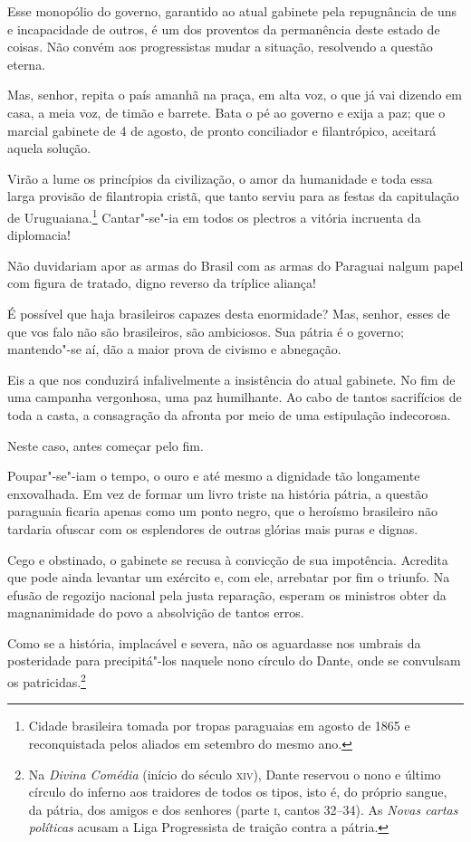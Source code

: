 \begin{linenumbers}
 Esse monopólio do governo, garantido ao atual gabinete pela repugnância
de uns e incapacidade de outros, é um dos proventos da permanência
deste estado de coisas. Não convém aos progressistas mudar a situação,
resolvendo a questão eterna. 

 Mas, senhor, repita o país amanhã na praça, em alta voz, o que já vai
dizendo em casa, a meia voz, de timão e barrete. Bata o pé ao governo e
exija a paz; que o marcial gabinete de 4 de agosto, de pronto
conciliador e filantrópico, aceitará aquela solução. 

 Virão a lume os princípios da civilização, o amor da humanidade e toda
essa larga provisão de filantropia cristã, que tanto serviu para as
festas da capitulação de
Uruguaiana.\footnote{ Cidade brasileira tomada por tropas paraguaias em agosto de 1865 e
reconquistada pelos aliados em setembro do mesmo ano.}
 Cantar"-se"-ia em todos os plectros a vitória incruenta da diplomacia!

 Não duvidariam apor as armas do Brasil com as armas do Paraguai nalgum
papel com figura de tratado, digno reverso da tríplice aliança!

É possível que haja brasileiros capazes desta enormidade? Mas, senhor,
esses de que vos falo não são brasileiros, são ambiciosos. Sua pátria é
o governo; mantendo"-se aí, dão a maior prova de civismo e abnegação. 

 Eis a que nos conduzirá infalivelmente a insistência do atual gabinete.
No fim de uma campanha vergonhosa, uma paz humilhante. Ao cabo de
tantos sacrifícios de toda a casta, a consagração da afronta por meio
de uma estipulação indecorosa. 

 Neste caso, antes começar pelo fim.

 Poupar"-se"-iam o tempo, o ouro e até mesmo a dignidade tão
longamente enxovalhada. Em vez de formar um livro triste na história
pátria, a questão paraguaia ficaria apenas como um ponto negro, que o
heroísmo brasileiro não tardaria ofuscar com os esplendores de outras
glórias mais puras e dignas.

 Cego e obstinado, o gabinete se recusa à convicção de sua impotência.
Acredita que pode ainda levantar um exército e, com ele, arrebatar por
fim o triunfo. Na efusão de regozijo nacional pela justa reparação,
esperam os ministros obter da magnanimidade do povo a absolvição de
tantos erros.

 Como se a história, implacável e severa, não os aguardasse nos umbrais
da posteridade para precipitá"-los naquele nono círculo do Dante, onde
se convulsam os
patricidas.\footnote{ Na \textit{Divina Comédia} (início do século \textsc{xiv}), Dante reservou o nono e
último círculo do inferno aos traidores de todos os tipos, isto é, do
próprio sangue, da pátria, dos amigos e dos senhores (parte \textsc{i}, cantos
32--34). As \textit{Novas cartas políticas} acusam a Liga Progressista
de traição contra a pátria.}
 

\end{linenumbers}
